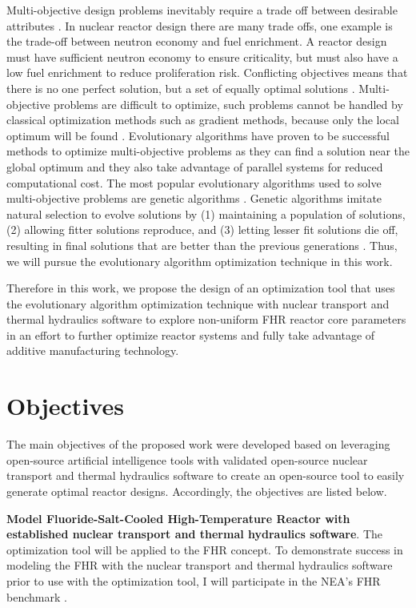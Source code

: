 Multi-objective design problems inevitably require a trade off between 
desirable attributes \cite{byrne_evolving_2014,simon_sciences_2019}. 
In nuclear reactor design there are many trade offs, one example is the 
trade-off between neutron economy and fuel enrichment. 
A reactor design must have sufficient neutron economy to ensure criticality, 
but must also have a low fuel enrichment to reduce proliferation risk.
Conflicting objectives means that there is no one perfect solution, but a set
of equally optimal solutions \cite{byrne_evolving_2014}.
Multi-objective problems are difficult to optimize, such problems 
cannot be handled by classical optimization methods such as gradient 
methods, because only the local optimum will be found \cite{renner_genetic_2003}. 
Evolutionary algorithms have proven to be successful 
methods to optimize multi-objective problems \cite{krish_practical_2011} as 
they can find a solution near the global optimum \cite{renner_genetic_2003}
and they also take advantage of parallel systems for reduced computational 
cost. 
The most popular evolutionary algorithms used to solve multi-objective 
problems are genetic algorithms 
\cite{byrne_evolving_2014, krish_practical_2011}. 
Genetic algorithms imitate natural selection to evolve solutions 
by (1) maintaining a population of solutions, (2) allowing 
fitter solutions reproduce, and (3) letting lesser fit solutions die off, 
resulting in final solutions that are better than the previous generations 
\cite{renner_genetic_2003}. 
Thus, we will pursue the evolutionary algorithm optimization technique 
in this work. 

Therefore in this work, we propose the design of an optimization tool that uses 
the evolutionary algorithm optimization technique with nuclear transport and 
thermal hydraulics software to explore non-uniform \gls{FHR} reactor core parameters 
in an effort to further optimize reactor systems and fully take advantage of 
additive manufacturing technology.  


\section{Objectives}
The main objectives of the proposed work were developed based on leveraging open-source 
artificial intelligence tools with validated open-source nuclear transport and 
thermal hydraulics software to create an open-source tool to easily generate 
optimal reactor designs. 
Accordingly, the objectives are listed below. 

\vspace{0.2cm} 
\noindent
\textbf{Model Fluoride-Salt-Cooled High-Temperature Reactor with established 
nuclear transport and thermal hydraulics software}.
The optimization tool will be applied to the \gls{FHR} concept. 
To demonstrate success in modeling the \gls{FHR} with the nuclear transport and 
thermal hydraulics software prior to use with the optimization tool, I will participate 
in the \gls{NEA}'s \gls{FHR} benchmark \cite{noauthor_fluoride_nodate}. 

